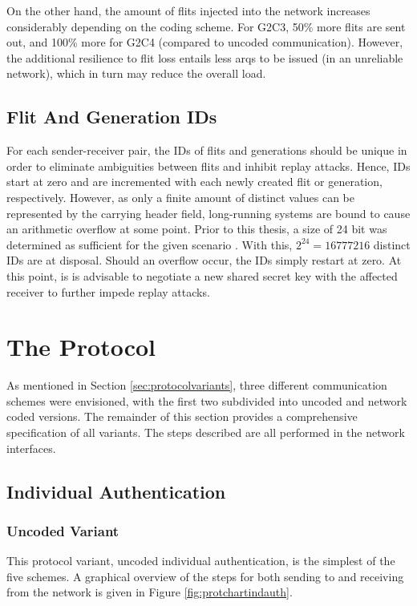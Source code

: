 On the other hand, the amount of flits injected into the network increases considerably depending on the coding scheme. For G2C3, 50\% more flits are
sent out, and 100\% more for G2C4 (compared to uncoded communication). However, the additional resilience to flit loss entails less \glspl{arq} to be
issued (in an unreliable network), which in turn may reduce the overall load.

\subsection{Flit And Generation IDs}
For each sender-receiver pair, the IDs of flits and generations should be unique in order to eliminate ambiguities between flits and inhibit replay
attacks. Hence, IDs start at zero and are incremented with each newly created flit or generation, respectively. However, as only a finite amount of
distinct values can be represented by the carrying header field, long-running systems are bound to cause an arithmetic overflow at some point. Prior
to this thesis, a size of 24 bit was determined as sufficient for the given scenario \cite[5]{franz18authdraft}. With this, $2^{24} = \num{16777216}$
distinct IDs are at disposal. Should an overflow occur, the IDs simply restart at zero. At this point, is is advisable to negotiate a new shared
secret key with the affected receiver to further impede replay attacks.

\section{The Protocol}\label{sec:theprotocol}
As mentioned in Section \ref{sec:protocolvariants}, three different communication schemes were envisioned, with the first two subdivided into uncoded
and network coded versions. The remainder of this section provides a comprehensive specification of all variants. The steps described are all
performed in the network interfaces.

\subsection{Individual Authentication}
\subsubsection{Uncoded Variant}
This protocol variant, uncoded individual authentication, is the simplest of the five schemes. A graphical overview of the steps for both sending to
and receiving from the network is given in Figure \vref{fig:protchartindauth}.

